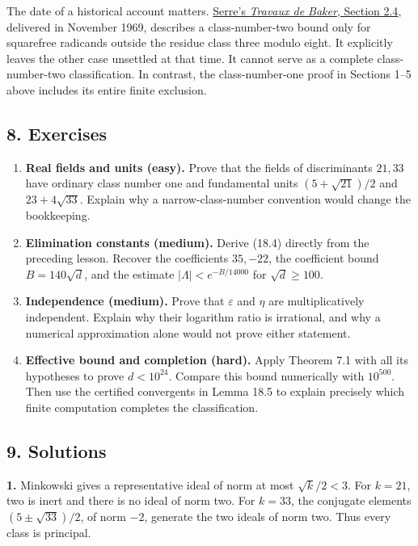 \documentclass[
  11pt,
  a4paper,
]{article}
\providecommand{\tightlist}{%
  \setlength{\itemsep}{0pt}\setlength{\parskip}{0pt}}
\begin{document}
The date of a historical account matters.
\href{https://numdam.org/item/SB_1969-1970__12__73_0.pdf}{Serre's
\emph{Travaux de Baker}, Section 2.4}, delivered in November 1969,
describes a class-number-two bound only for squarefree radicands outside
the residue class three modulo eight. It explicitly leaves the other
case unsettled at that time. It cannot serve as a complete
class-number-two classification. In contrast, the class-number-one proof
in Sections 1--5 above includes its entire finite exclusion.

\subsection{8. Exercises}\label{exercises}

\begin{enumerate}
\def\labelenumi{\arabic{enumi}.}
\tightlist
\item
  \textbf{Real fields and units (easy).} Prove that the fields of
  discriminants \(21,33\) have ordinary class number one and fundamental
  units \((5+\sqrt{21})/2\) and \(23+4\sqrt{33}\). Explain why a
  narrow-class-number convention would change the bookkeeping.
\item
  \textbf{Elimination constants (medium).} Derive (18.4) directly from
  the preceding lesson. Recover the coefficients \(35,-22\), the
  coefficient bound \(B=140\sqrt d\), and the estimate
  \(|\Lambda|<e^{-B/14000}\) for \(\sqrt d\ge100\).
\item
  \textbf{Independence (medium).} Prove that \(\varepsilon\) and
  \(\eta\) are multiplicatively independent. Explain why their logarithm
  ratio is irrational, and why a numerical approximation alone would not
  prove either statement.
\item
  \textbf{Effective bound and completion (hard).} Apply Theorem 7.1 with
  all its hypotheses to prove \(d<10^{24}\). Compare this bound
  numerically with \(10^{500}\). Then use the certified convergents in
  Lemma 18.5 to explain precisely which finite computation completes the
  classification.
\end{enumerate}

\subsection{9. Solutions}\label{solutions}

\textbf{1.} Minkowski gives a representative ideal of norm at most
\(\sqrt{k}/2<3\). For \(k=21\), two is inert and there is no ideal of
norm two. For \(k=33\), the conjugate elements \((5\pm\sqrt{33})/2\), of
norm \(-2\), generate the two ideals of norm two. Thus every class is
principal.
\end{document}
